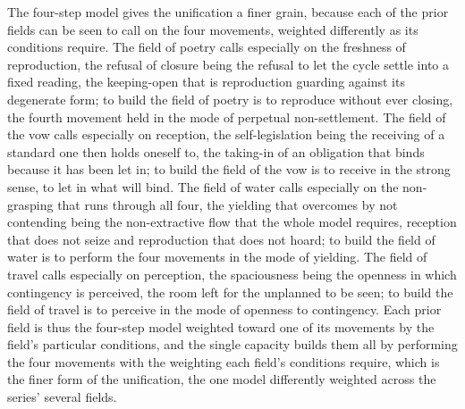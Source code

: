 
The four-step model gives the unification a finer grain, because each of the prior fields can be seen to call on the four movements, weighted differently as its conditions require. The field of poetry calls especially on the freshness of reproduction, the refusal of closure being the refusal to let the cycle settle into a fixed reading, the keeping-open that is reproduction guarding against its degenerate form; to build the field of poetry is to reproduce without ever closing, the fourth movement held in the mode of perpetual non-settlement. The field of the vow calls especially on reception, the self-legislation being the receiving of a standard one then holds oneself to, the taking-in of an obligation that binds because it has been let in; to build the field of the vow is to receive in the strong sense, to let in what will bind. The field of water calls especially on the non-grasping that runs through all four, the yielding that overcomes by not contending being the non-extractive flow that the whole model requires, reception that does not seize and reproduction that does not hoard; to build the field of water is to perform the four movements in the mode of yielding. The field of travel calls especially on perception, the spaciousness being the openness in which contingency is perceived, the room left for the unplanned to be seen; to build the field of travel is to perceive in the mode of openness to contingency. Each prior field is thus the four-step model weighted toward one of its movements by the field's particular conditions, and the single capacity builds them all by performing the four movements with the weighting each field's conditions require, which is the finer form of the unification, the one model differently weighted across the series' several fields.

